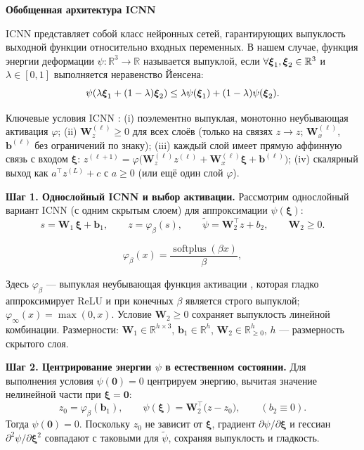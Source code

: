 \textbf{Обобщенная архитектура ICNN}

ICNN представляет собой класс нейронных сетей, гарантирующих выпуклость выходной функции относительно входных переменных. 
В нашем случае, функция энергии деформации $\psi: \mathbb{R}^3 \rightarrow \mathbb{R}$ называется выпуклой, 
если $\forall \boldsymbol{\xi}_1, \boldsymbol{\xi}_2 \in \mathbb{R}^3$ и $\lambda \in [0,1]$ выполняется неравенство Йенсена:
\begin{equation}
\psi(\lambda \boldsymbol{\xi}_1 + (1-\lambda) \boldsymbol{\xi}_2) \leq \lambda \psi(\boldsymbol{\xi}_1) + (1-\lambda) \psi(\boldsymbol{\xi}_2).
\label{eq:convexity_definition}
\end{equation}

Ключевые условия ICNN \cite{icnn2017}: 
(i) поэлементно выпуклая, монотонно неубывающая активация $\varphi$; 
(ii) $\mathbf{W}_z^{(\ell)}\!\ge\!0$ для всех слоёв 
(только на связях $z\!\to\!z$; $\mathbf{W}_x^{(\ell)}$, $\mathbf{b}^{(\ell)}$ без ограничений по знаку); 
(iii) каждый слой имеет прямую аффинную связь с входом 
$\boldsymbol{\xi}$: $z^{(\ell+1)}=\varphi\!\big(\mathbf{W}_z^{(\ell)}z^{(\ell)}+\mathbf{W}_x^{(\ell)}\boldsymbol{\xi}+\mathbf{b}^{(\ell)}\big)$; 
(iv) скалярный выход как $a^{\top} z^{(L)}+c$ с $a\!\ge\!0$ (или ещё один слой $\varphi$).

\textbf{Шаг 1. Однослойный ICNN и выбор активации.}
Рассмотрим однослойный вариант ICNN (с одним скрытым слоем) для аппроксимации $\psi(\boldsymbol{\xi})$:
\begin{equation}
  s = \mathbf{W}_1 \,\boldsymbol{\xi} + \mathbf{b}_1,\qquad
  z = \varphi_{\beta}(s),\qquad
  \tilde{\psi} = \mathbf{W}_2^{\top} z + b_2,\qquad \mathbf{W}_2 \ge 0.
  \label{eq:icnn_onelayer}
\end{equation}

\begin{equation}
  \varphi_{\beta}(x) = \frac{\operatorname{softplus}(\beta x)}{\beta},
  \label{eq:softplus_activation}
\end{equation}

Здесь $\varphi_{\beta}$ — выпуклая неубывающая функция активации \cite{dugas2001incorporating}, 
которая гладко аппроксимирует ReLU и при конечных $\beta$ является строго выпуклой; $\varphi_{\infty}(x)=\max(0,x)$.
Условие $\mathbf{W}_2\!\ge 0$ сохраняет выпуклость линейной комбинации. 
Размерности: $\mathbf{W}_1\!\in\mathbb{R}^{h\times 3}$, $\mathbf{b}_1\!\in\mathbb{R}^{h}$, 
$\mathbf{W}_2\!\in\mathbb{R}^{h}_{\ge 0}$, $h$ — размерность скрытого слоя.

\textbf{Шаг 2. Центрирование энергии $\psi$ в естественном состоянии.}
Для выполнения условия $\psi(\mathbf{0})=0$ центрируем энергию, 
вычитая значение нелинейной части при $\boldsymbol{\xi}=\mathbf{0}$:
\begin{equation}
  z_0 = \varphi_{\beta}(\mathbf{b}_1),\qquad
  \psi(\boldsymbol{\xi}) = \mathbf{W}_2^{\top}\big(z - z_0\big),\qquad (b_2 \equiv 0).
  \label{eq:center_psi}
\end{equation}
Тогда $\psi(\mathbf{0})=0$. Поскольку $z_0$ не зависит от $\boldsymbol{\xi}$, 
градиент $\partial\psi/\partial\boldsymbol{\xi}$ и гессиан $\partial^2\psi/\partial\boldsymbol{\xi}^2$ 
совпадают с таковыми для $\tilde{\psi}$, сохраняя выпуклость и гладкость.

